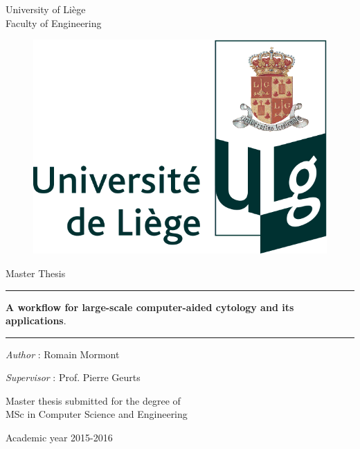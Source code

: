 \thispagestyle{empty}
{ \sf

\begin{center}
	{\small University of Liège}\\
	{\small Faculty of Engineering}
\end{center}

\vfill

\begin{figure}[!h]
	\center
	\includegraphics[scale=0.2]{image/institution_ulg.png}
\end{figure}

\vfill

\begin{center}
	{\LARGE Master Thesis\\}
\end{center}

\noindent\rule{1\linewidth}{1px}

\begin{center}
	{\LARGE \sf \textbf{A workflow for large-scale computer-aided cytology and its applications}.}
\end{center}

\noindent\rule{1\linewidth}{1px}

\begin{center}
	\textit{Author} : Romain Mormont
\end{center}

\begin{center}
	\textit{Supervisor} : Prof. Pierre Geurts
\end{center}

\vfill

\begin{center}
	Master thesis submitted for the degree of \\
	\vspace{0.25cm}
	{\Large MSc in Computer Science and Engineering}
\end{center}

\vfill
\begin{center}
Academic year 2015-2016\\
\end{center}
}